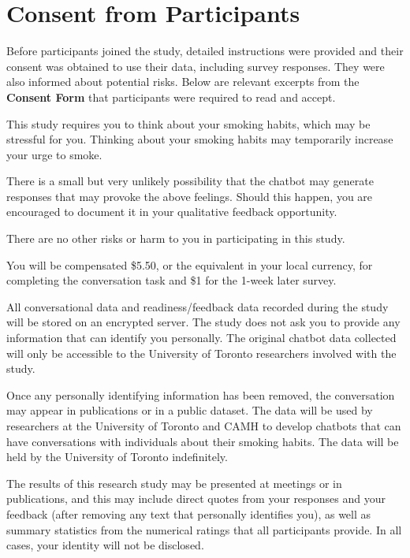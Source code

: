 \chapter{Consent from Participants}
\label{app-consent}


Before participants joined the study, detailed instructions were provided and their consent was obtained to use their data, including survey responses. They were also informed about potential risks. Below are relevant excerpts from the \textbf{Consent Form} that participants were required to read and accept.


\vspace{12pt}

\begin{tcolorbox}[breakable,title=WHAT ARE THE RISKS OR HARM OF PARTICIPATING IN THIS STUDY?]
	This study requires you to think about your smoking habits, which may be stressful for you. Thinking about your smoking habits may temporarily increase your urge to smoke.

	There is a small but very unlikely possibility that the chatbot may generate responses that may provoke the above feelings. Should this happen, you are encouraged to document it in your qualitative feedback opportunity.

	There are no other risks or harm to you in participating in this study.
\end{tcolorbox}

\vspace{12pt}

\begin{tcolorbox}[breakable,title=WHAT COMPENSATION AM I ENTITLED TO?]
	You will be compensated \$5.50, or the equivalent in your local currency, for completing the conversation task and \$1 for the 1-week later survey.
\end{tcolorbox}

\vspace{12pt}

\begin{tcolorbox}[breakable,title=HOW WILL MY PRIVACY BE RESPECTED?]
	All conversational data and readiness/feedback data recorded during the study will be stored on an encrypted server. The study does not ask you to provide any information that can identify you personally. The original chatbot data collected will only be accessible to the University of Toronto researchers involved with the study.

	Once any personally identifying information has been removed, the conversation may appear in publications or in a public dataset. The data will be used by researchers at the University of Toronto and CAMH to develop chatbots that can have conversations with individuals about their smoking habits. The data will be held by the University of Toronto indefinitely.

	The results of this research study may be presented at meetings or in publications, and this may include direct quotes from your responses and your feedback (after removing any text that personally identifies you), as well as summary statistics from the numerical ratings that all participants provide. In all cases, your identity will not be disclosed.
\end{tcolorbox}
